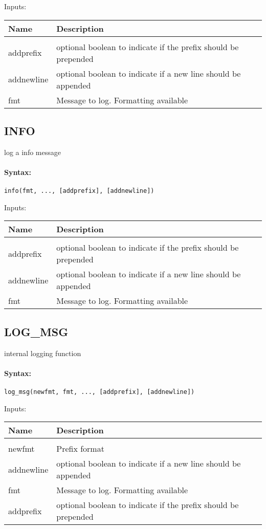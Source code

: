 Inputs:

\begin{tabular}{|l|p{5cm}|}
\hline
\textbf{Name} & \textbf{Description} \\
\hline \hline \\
addprefix & optional boolean to indicate if the prefix should be prepended  \\ \hline
addnewline & optional boolean to indicate if a new line should be appended  \\ \hline
fmt & Message to log. Formatting available  \\ \hline
\end{tabular}

\subsection{INFO}

log a info message

\paragraph{Syntax:} \verb|info(fmt, ..., [addprefix], [addnewline])|

Inputs:

\begin{tabular}{|l|p{5cm}|}
\hline
\textbf{Name} & \textbf{Description} \\
\hline \hline \\
addprefix & optional boolean to indicate if the prefix should be prepended  \\ \hline
addnewline & optional boolean to indicate if a new line should be appended  \\ \hline
fmt & Message to log. Formatting available  \\ \hline
\end{tabular}

\subsection{LOG\_MSG}

internal logging function

\paragraph{Syntax:} \verb|log_msg(newfmt, fmt, ..., [addprefix], [addnewline])|

Inputs:

\begin{tabular}{|l|p{5cm}|}
\hline
\textbf{Name} & \textbf{Description} \\
\hline \hline \\
newfmt & Prefix format  \\ \hline
addnewline & optional boolean to indicate if a new line should be appended  \\ \hline
fmt & Message to log. Formatting available  \\ \hline
addprefix & optional boolean to indicate if the prefix should be prepended  \\ \hline
\end{tabular}

